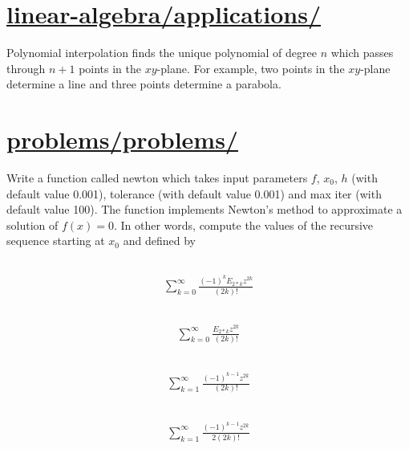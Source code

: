 \documentclass[12pt]{article}
\begin{document}
\section{\href{https://patrickwalls.github.io/mathematicalpython/linear-algebra/applications/}{linear-algebra/applications/}}
Polynomial interpolation finds the unique polynomial of degree $n$ which passes through $n+1$ points in the $xy$-plane. For example, two points in the $xy$-plane determine a line and three points determine a parabola.
\vspace{1cm}
\section{\href{https://patrickwalls.github.io/mathematicalpython/problems/problems/}{problems/problems/}}
Write a function called newton which takes input parameters $f$, $x_0$, $h$ (with default value 0.001), tolerance (with default value 0.001) and max iter (with default value 100). The function implements Newton's method to approximate a solution of $f(x) = 0$. In other words, compute the values of the recursive sequence starting at $x_0$ and defined by
\vspace{1cm}
\subsection{}
\begin{align*}
\sum_{k=0}^{\infty} \frac{\left(-1\right)^{k} E_{2*k} z^{2 k}}{\left(2 k\right)!}
\end{align*}
\vspace{1cm}
\subsection{}
\begin{align*}
\sum_{k=0}^{\infty} \frac{E_{2*k} z^{2 k}}{\left(2 k\right)!}
\end{align*}
\vspace{1cm}
\subsection{}
\begin{align*}
\sum_{k=1}^{\infty} \frac{\left(-1\right)^{k - 1} z^{2 k}}{\left(2 k\right)!}
\end{align*}
\vspace{1cm}
\subsection{}
\begin{align*}
\sum_{k=1}^{\infty} \frac{\left(-1\right)^{k - 1} z^{2 k}}{2 \left(2 k\right)!}
\end{align*}
\vspace{1cm}
\end{document}
